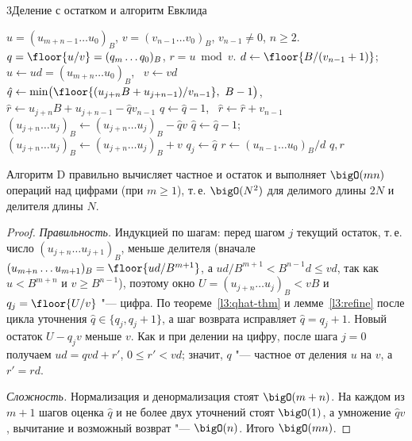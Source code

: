 \begin{lecture}{3}{Деление с остатком и алгоритм Евклида}
\begin{algorithm}\label{l3:algD}
\begin{algorithmic}[1]
\Require $u = (u_{m+n-1} \dots u_0)_B$, $v = (v_{n-1} \dots v_0)_B$, $v_{n-1} \ne 0$, $n \ge 2$.
\Ensure $q = \floor{u/v} = (q_m \dots q_0)_B$, $r = u \bmod v$.
\State $d \gets \floor{B / (v_{n-1} + 1)}$; \ $u \gets ud = (u_{m+n} \dots u_0)_B$, \ $v \gets vd$
  \State $\hat q \gets \min\bigl(\floor{(u_{j+n} B + u_{j+n-1}) / v_{n-1}},\ B - 1\bigr)$,
    \ $\hat r \gets u_{j+n} B + u_{j+n-1} - \hat q v_{n-1}$ 
    \State $\hat q \gets \hat q - 1$, \ $\hat r \gets \hat r + v_{n-1}$
  \EndWhile
  \State $(u_{j+n} \dots u_j)_B \gets (u_{j+n} \dots u_j)_B - \hat q v$ 
    \State $\hat q \gets \hat q - 1$; \ $(u_{j+n} \dots u_j)_B \gets (u_{j+n} \dots u_j)_B + v$
  \EndIf
  \State $q_j \gets \hat q$
\EndFor
\State $r \gets (u_{n-1} \dots u_0)_B / d$ 
\State \Return $q, r$
\end{algorithmic}
\end{algorithm}

\begin{theorem}\label{l3:algD-cost}
Алгоритм D правильно вычисляет частное и остаток и выполняет $\bigO(mn)$ операций над цифрами
(при $m \ge 1$), т.\,е. $\bigO(N^2)$ для делимого длины $2N$ и делителя длины $N$.
\end{theorem}

\begin{proof}
\emph{Правильность.} Индукцией по шагам: перед шагом $j$ текущий остаток, т.\,е. число
$(u_{j+n} \dots u_{j+1})_B$, меньше делителя (вначале
$(u_{m+n} \dots u_{m+1})_B = \floor{ud / B^{m+1}}$,
а $ud / B^{m+1} < B^{n-1} d \le vd$, так как $u < B^{m+n}$ и $v \ge B^{n-1}$),
поэтому окно $U = (u_{j+n} \dots u_j)_B < vB$ и $q_j = \floor{U/v}$ "--- цифра. По
теореме~\ref{l3:qhat-thm} и лемме~\ref{l3:refine} после цикла уточнения $\hat q \in \{q_j, q_j + 1\}$,
а шаг возврата исправляет $\hat q = q_j + 1$. Новый остаток $U - q_j v$ меньше $v$. Как и при
делении на цифру, после шага $j = 0$ получаем $ud = qvd + r'$, $0 \le r' < vd$; значит, $q$ "---
частное от деления $u$ на $v$, а $r' = rd$.

\emph{Сложность.} Нормализация и денормализация стоят $\bigO(m + n)$. На каждом из $m + 1$ шагов
оценка $\hat q$ и не более двух уточнений стоят $\bigO(1)$, а умножение $\hat q v$, вычитание и
возможный возврат "--- $\bigO(n)$. Итого $\bigO(mn)$.
\end{proof}


\end{lecture}
